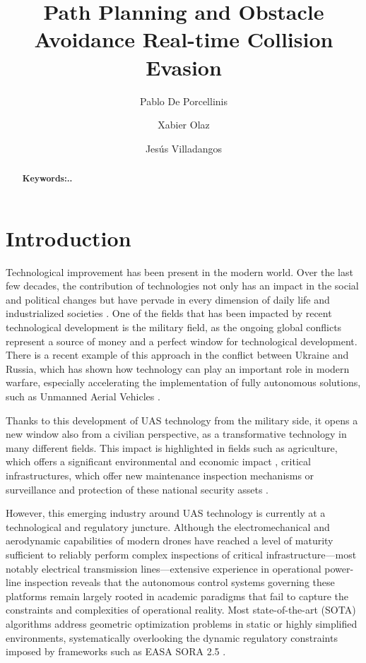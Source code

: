 \documentclass[a4paper, 11pt]{article}
\title{Path Planning and Obstacle Avoidance Real-time Collision Evasion}
\author[1,2]{Pablo De Porcellinis}
\author[1]{Xabier Olaz}
\author[1,3]{Jesús Villadangos}
\affil[1]{Mathematical Engineering and Computer Science Department, Public University of Navarre, Spain}
\affil[2]{FuVeX Civil SL, Spain}
\affil[3]{Institute of Smart Cities, Public University of Navarre,, Spain}
\date{}
\begin{document}
\maketitle

\begin{abstract}

\textbf{Keywords:..}

\end{abstract}

\section{Introduction}

Technological improvement has been present in the modern world. Over the last few decades, the contribution of technologies not only has an impact in the social and political changes but have pervade in every dimension of daily life and industrialized societies \cite{johnson2021technology}.
One of the fields that has been impacted by recent technological development is the military field, as the ongoing global conflicts represent a source of money and a perfect window for technological development. There is a recent example of this approach in the conflict between Ukraine and Russia, which has shown how technology can play an important role in modern warfare, especially accelerating the implementation of fully autonomous solutions, such as Unmanned Aerial Vehicles \cite{samakashvili2024technology}.

Thanks to this development of UAS technology from the military side, it opens a new window also from a civilian perspective, as a transformative technology in many different fields. This impact is highlighted in fields such as agriculture, which offers a significant environmental and economic impact \cite{imran2025environmental}, critical infrastructures, which offer new maintenance inspection mechanisms or surveillance and protection of these national security assets \cite{marut2024surveillance}.

However, this emerging industry around UAS technology is currently at a technological and regulatory juncture. Although the electromechanical and aerodynamic capabilities of modern drones have reached a level of maturity sufficient to reliably perform complex inspections of critical infrastructure—most notably electrical transmission lines—extensive experience in operational power-line inspection reveals that the autonomous control systems governing these platforms remain largely rooted in academic paradigms that fail to capture the constraints and complexities of operational reality. Most state-of-the-art (SOTA) algorithms address geometric optimization problems in static or highly simplified environments, systematically overlooking the dynamic regulatory constraints imposed by frameworks such as EASA SORA 2.5 \cite{EASA_AMC_GM_SORA25_2025}.
\end{document}
